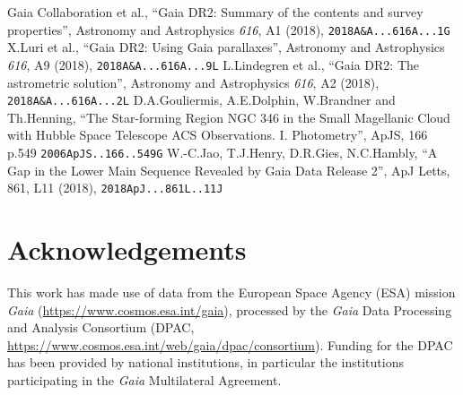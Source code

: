 \documentclass{article}
\begin{document}
\begin{thebibliography}{9}
   Gaia Collaboration et al.,
   ``Gaia DR2: Summary of the contents and survey properties'',
   Astronomy and Astrophysics {\em 616}, A1 (2018),
   {\tt 2018A\&A...616A...1G}
   X.Luri et al.,
   ``Gaia DR2: Using Gaia parallaxes'',
   Astronomy and Astrophysics {\em 616}, A9 (2018),
   {\tt 2018A\&A...616A...9L}
   L.Lindegren et al.,
   ``Gaia DR2: The astrometric solution'',
   Astronomy and Astrophysics {\em 616}, A2 (2018),
   {\tt 2018A\&A...616A...2L}
   D.A.Gouliermis, A.E.Dolphin, W.Brandner and Th.Henning,
   ``The Star-forming Region NGC 346 in the Small Magellanic
     Cloud with Hubble Space Telescope ACS Observations. I. Photometry'',
   ApJS, 166 p.549
   {\tt 2006ApJS..166..549G}
   W.-C.Jao, T.J.Henry, D.R.Gies, N.C.Hambly,
   ``A Gap in the Lower Main Sequence Revealed by Gaia Data Release 2'',
   ApJ Letts, 861, L11 (2018),
   {\tt 2018ApJ...861L..11J}
\end{thebibliography}

\section*{Acknowledgements}

This work has made use of data from the European Space Agency (ESA) mission
{\it Gaia} (\url{https://www.cosmos.esa.int/gaia}), processed by the {\it Gaia}
Data Processing and Analysis Consortium
(DPAC, \url{https://www.cosmos.esa.int/web/gaia/dpac/consortium}).
Funding for the DPAC
has been provided by national institutions, in particular the institutions
participating in the {\it Gaia} Multilateral Agreement.


\label{lastPage}
\end{document}
